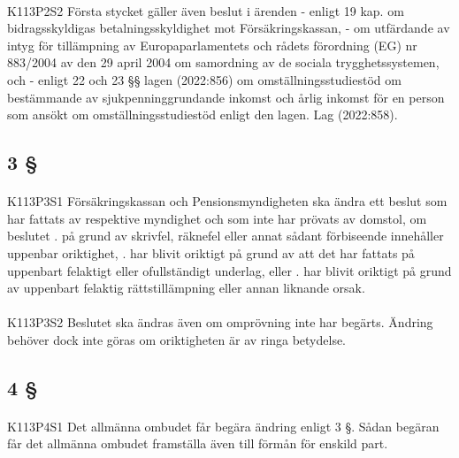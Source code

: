 \documentclass[a4paper,notitlepage,openany,10pt]{book}
\begin{document}
\paragraph*{}
{\tiny K113P2S2}
Första stycket gäller även beslut i ärenden
\newline - enligt 19 kap. om bidragsskyldigas betalningsskyldighet mot Försäkringskassan,
\newline - om utfärdande av intyg för tillämpning av Europaparlamentets och rådets förordning (EG) nr 883/2004 av den 29 april 2004 om samordning av de sociala trygghetssystemen, och
\newline - enligt 22 och 23 §§ lagen (2022:856) om omställningsstudiestöd om bestämmande av sjukpenninggrundande inkomst och årlig inkomst för en person som ansökt om omställningsstudiestöd enligt den lagen.
Lag (2022:858).
\subsection*{3 §}
\paragraph*{}
{\tiny K113P3S1}
Försäkringskassan och Pensionsmyndigheten ska ändra ett beslut som har fattats av respektive myndighet och som inte har prövats av domstol, om beslutet
. på grund av skrivfel, räknefel eller annat sådant förbiseende innehåller uppenbar oriktighet,
. har blivit oriktigt på grund av att det har fattats på uppenbart felaktigt eller ofullständigt underlag, eller
. har blivit oriktigt på grund av uppenbart felaktig rättstillämpning eller annan liknande orsak.
\paragraph*{}
{\tiny K113P3S2}
Beslutet ska ändras även om omprövning inte har begärts.
Ändring behöver dock inte göras om oriktigheten är av ringa betydelse.
\subsection*{4 §}
\paragraph*{}
{\tiny K113P4S1}
Det allmänna ombudet får begära ändring enligt 3 §. Sådan begäran får det allmänna ombudet framställa även till förmån för enskild part.
\end{document}
